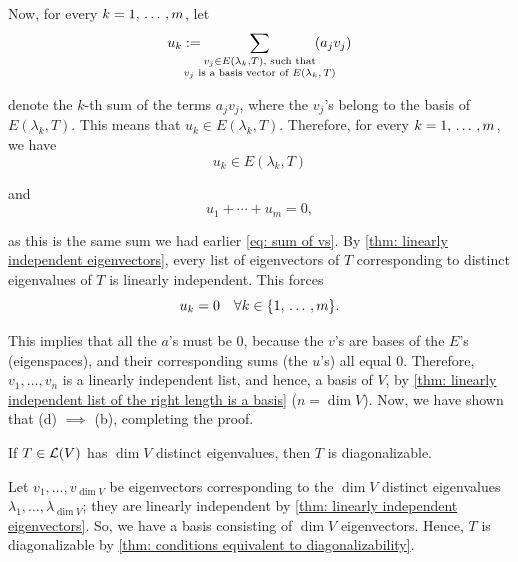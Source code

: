 \begin{prf}
  Now, for every $k = 1, {\, \ldots \,\,}, m$, let
  \begin{equation}
    u_k := \hspace{-1.5em} \sum_{\substack{v_j \in E(\lambda_k, T), \text{ such that} \\ \text{$v_j$ is a basis vector of $E(\lambda_k, T)$}}} \hspace{-1.5em} (a_j v_j)
  \end{equation}

  denote the $k$-th sum of the terms $a_jv_j$, where the $v_j$'s belong to the basis of $E(\lambda_k, T)$. This means that $u_k \in E(\lambda_k, T)$.
  Therefore, for every $k = 1, {\, \ldots \,\,}, m$, we have
  \begin{equation}
    u_k \in E(\lambda_k, T)
  \end{equation}

  and
  \begin{equation}
    u_1 + \cdots + u_m = 0,
  \end{equation}

  as this is the same sum we had earlier \eqref{eq: sum of vs}. By \ref{thm: linearly independent eigenvectors},
  every list of eigenvectors of $T$ corresponding to distinct eigenvalues of $T$ is linearly independent. This forces
  \begin{equation}
    u_k = 0 \quad \forall k \in \{1, {\, \ldots \,\,}, m \}.
  \end{equation}

  This implies that all the $a$'s must be $0$, because the $v$'s are bases of the $E$'s (eigenspaces), and their corresponding sums (the $u$'s) all equal $0$. Therefore, $v_1, \ldots, v_n$ is a linearly independent list, and hence, a basis of $V$, by \ref{thm: linearly independent list of the right length is a basis} ($n = \dim V$). Now, we have shown that (d) $\implies$ (b), completing the proof.
\end{prf}

\setcounter{thm}{57}
\begin{thm} 
  \label{thm: enough eigenvalues implies diagonalizability}
  If $T\in \mathcal{L}(V)$ has $\dim V$ distinct eigenvalues, then $T$ is diagonalizable.
\end{thm}
\begin{prf}
  Let $v_1, \ldots, v_{\dim V}$ be eigenvectors corresponding to the $\dim V$ distinct eigenvalues $\lambda_1, \ldots, \lambda_{\dim V}$; they are linearly independent by \ref{thm: linearly independent eigenvectors}. So, we have a basis consisting of $\dim V$ eigenvectors. Hence, $T$ is diagonalizable by \ref{thm: conditions equivalent to diagonalizability}.
\end{prf}

